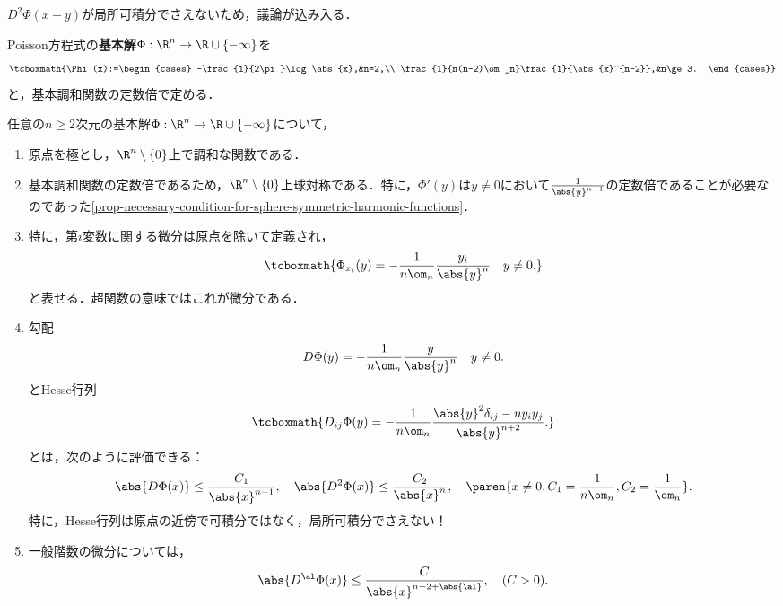 \documentclass[uplatex,dvipdfmx]{jsreport}
\begin{document}
\begin{tcolorbox}[colframe=ForestGreen, colback=ForestGreen!10!white,breakable,colbacktitle=ForestGreen!40!white,coltitle=black,fonttitle=\bfseries\sffamily,
title=]
    $D^2\Phi(x-y)$が局所可積分でさえないため，議論が込み入る．
\end{tcolorbox}

\begin{definition}
    Poisson方程式の\textbf{基本解}$\Phi:\R^n\to\R\cup\{-\infty\}$を
    \[\tcboxmath{\Phi(x):=\begin{cases}
        -\frac{1}{2\pi}\log\abs{x},&n=2,\\
        \frac{1}{n(n-2)\om_n}\frac{1}{\abs{x}^{n-2}},&n\ge3.
    \end{cases}}\]
    と，基本調和関数の定数倍で定める．
\end{definition}

\begin{proposition}[微分に関する性質]\label{prop-derivative-of-fundamental-solution}
    任意の$n\ge2$次元の基本解$\Phi:\R^n\to\R\cup\{-\infty\}$について，
    \begin{enumerate}
        \item 原点を極とし，$\R^n\setminus\{0\}$上で調和な関数である．
        \item 基本調和関数の定数倍であるため，$\R^n\setminus\{0\}$上球対称である．特に，$\Phi'(y)$は$y\ne0$において$\frac{1}{\abs{y}^{n-1}}$の定数倍であることが必要なのであった\ref{prop-necessary-condition-for-sphere-symmetric-harmonic-functions}．
        \item 特に，第$i$変数に関する微分は原点を除いて定義され，
        \[\tcboxmath{\Phi_{x_i}(y)=-\frac{1}{n\om_n}\frac{y_i}{\abs{y}^n}\quad y\ne0.}\]
        と表せる．超関数の意味ではこれが微分である．
        \item 勾配
        \[D\Phi(y)=-\frac{1}{n\om_n}\frac{y}{\abs{y}^{n}}\quad y\ne0.\]
        とHesse行列
        \[\tcboxmath{D_{ij}\Phi(y)=-\frac{1}{n\om_n}\frac{\abs{y}^2\delta_{ij}-ny_iy_j}{\abs{y}^{n+2}}.}\]
        とは，次のように評価できる：
        \[\abs{D\Phi(x)}\le\frac{C_1}{\abs{x}^{n-1}},\quad\abs{D^2\Phi(x)}\le\frac{C_2}{\abs{x}^n},\quad \paren{x\ne0,C_1=\frac{1}{n\om_n},C_2=\frac{1}{\om_n}}.\]
        特に，Hesse行列は原点の近傍で可積分ではなく，局所可積分でさえない！
        \item 一般階数の微分については，
        \[\abs{D^\al\Phi(x)}\le\frac{C}{\abs{x}^{n-2+\abs{\al}}},\quad(C>0).\]
    \end{enumerate}
\end{proposition}
\end{document}
